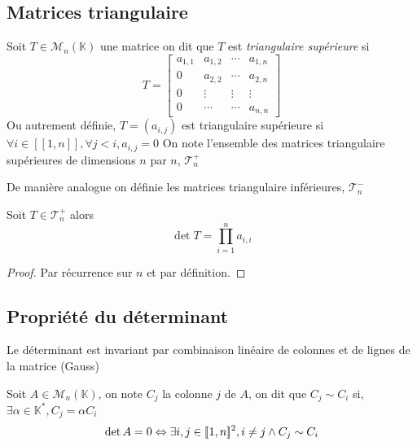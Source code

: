 \documentclass[11pt,colorlinks]{book}
\theoremstyle{mytheoremstyle}
\theoremstyle{mytheoremstyle}
\theoremstyle{mytheoremstyle}
\theoremstyle{mytheoremstyle}
\theoremstyle{mytheoremstyle}
\theoremstyle{mytheoremstyle}
\theoremstyle{mytheoremstyle}
\theoremstyle{mytheoremstyle}
\theoremstyle{myproblemstyle}
\def\mbb#1{\mathbb{#1}}
\def\bK{\mbb{K}}
\renewcommand{\equiv}{\sim}
\begin{document}
\subsection{Matrices triangulaire}
\begin{definition}
  Soit $T \in \mathcal{M}_n(\bK)$ une matrice on dit que $T$ est \textit{triangulaire supérieure} si 
  \begin{equation*}
    T = \begin{bmatrix}
      a_{1,1} & a_{1,2} & \cdots & a_{1,n} \\ 
      0 & a_{2,2} & \cdots & a_{2,n} \\ 
      0 & \vdots & \vdots & \vdots \\ 
      0 & \cdots & \cdots & a_{n,n}
    \end{bmatrix}
  \end{equation*}
  Ou autrement définie, $T = (a_{i,j})$ est triangulaire supérieure si $\forall i \in [\![1,n]\!], \forall j < i, a_{i,j} = 0$
  On note l'ensemble des matrices triangulaire supérieures de dimensions $n$ par $n$,  $\mathcal{T}^{+}_n$
  \end{definition}
  \begin{rmq}
    De manière analogue on définie les matrices triangulaire inférieures, $\mathcal T^{-}_n$
  \end{rmq}
  \begin{theorem}
    Soit $T \in \mathcal{T}^{+}_n$ alors 
    \begin{equation*}
      \det T = \prod_{i=1}^n a_{i,i}
    \end{equation*}
    \begin{proof}
      Par récurrence sur $n$ et par définition.
    \end{proof}
  \end{theorem}
\subsection{Propriété du déterminant}
\begin{theorem}
  Le déterminant est invariant par combinaison linéaire de colonnes et de lignes de la matrice (Gauss)
\end{theorem}
\begin{prop}
  Soit $A \in \mathcal{M}_n(\bK)$, on note $C_j$ la colonne $j$ de $A$, on dit que $C_j \equiv C_i$ si, $\exists \alpha \in \bK^{*}, C_j = \alpha C_i$
  \begin{equation*}
    \det A = 0 \Leftrightarrow \exists i,j \in [\![1,n]\!]^2, i \not= j \wedge C_j \equiv C_i \\ 
  \end{equation*}
\end{prop}
\end{document}
